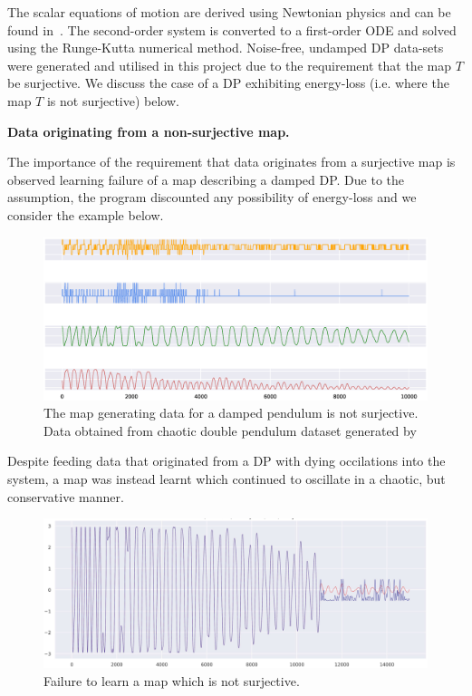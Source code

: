 \documentclass[a4paper,12pt,twoside]{report}
\begin{document}
The scalar equations of motion are derived using Newtonian physics and can be found in~\cite{DPFormulas}. The second-order system is converted to a first-order ODE and solved using the Runge-Kutta numerical method.  Noise-free, undamped DP data-sets were generated and utilised in this project due to the requirement that the map $T$ be surjective. We discuss the case of a DP exhibiting energy-loss (i.e. where the map $T$ is not surjective) below.

\textbf{Data originating from a non-surjective map.}

The importance of the requirement that data originates from a surjective map is observed learning failure of a map describing a damped DP.
Due to the assumption, the program discounted any possibility of energy-loss and we consider the example below. 

\begin{figure}[ht]
  \includegraphics[scale=0.4]{_dp_dying.eps}
  \centering
\caption{The map generating data for a damped pendulum is not surjective. Data obtained from chaotic double pendulum dataset generated by~\cite{asseman2018learning}}
\label{fig:damped_pendulum}
\end{figure}

Despite feeding data that originated from a DP with dying occilations into the system, a map was instead learnt which continued to oscillate in a chaotic, but conservative manner.

\begin{figure}[ht]
  \includegraphics[scale=0.4]{_dpfail_nonsurj.eps}
  \centering
\caption{Failure to learn a map which is not surjective.}
\label{fig:dp_notsurjective}
\end{figure}
\end{document}
